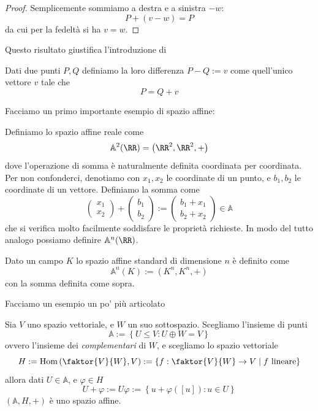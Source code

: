 \documentclass[11pt]{scrartcl}
\begin{document}
   	 \begin{proof}
   	 	Semplicemente sommiamo a destra e a sinistra $-w$:
   	 	$$P+(v-w)=P$$
   	 	da cui per la fedeltà si ha $v=w$.
   	 \end{proof}
   	 Questo risultato giustifica l'introduzione di
   	 \begin{definition}
   	 	Dati due punti $P,Q$ definiamo la loro differenza $P-Q:=v$ come quell'unico vettore $v$ tale che
   	 	$$P=Q+v$$
   	 \end{definition}
   	 Facciamo un primo importante esempio di spazio affine:
   	 \begin{example}
   	 	Definiamo lo spazio affine reale come
   	 	$$\mathbb{A}^2(\RR)=\left(\RR^2,\RR^2,+\right)$$
   	 	dove l'operazione di somma è naturalmente definita coordinata per coordinata. Per non confonderci, denotiamo con $x_1,x_2$ le coordinate di un punto, e $b_1,b_2$ le coordinate di un vettore. Definiamo la somma come
   	 	$$\begin{pmatrix}
   	 		x_1 \\
   	 		x_2
   	 	\end{pmatrix}
   	 	+
   	 	\begin{pmatrix}
   	 		b_1 \\
   	 		b_2
   	 	\end{pmatrix}:=
   	 	\begin{pmatrix}
   	 		b_1+x_1 \\
   	 		b_2+x_2
   	 	\end{pmatrix}\in \mathbb{A}
   	 	$$
   	 	che si verifica molto facilmente soddisfare le proprietà richieste. In modo del tutto analogo possiamo definire $\mathbb{A}^n\!\left(\RR\right)$.
   	 \end{example}
   	 \begin{definition}
   	 	Dato un campo $K$ lo spazio affine standard di dimensione $n$ è definito come
   	 	$$\mathbb{A}^n\left(K\right):=\left(K^n,K^n,+\right)$$
   	 	con la somma definita come sopra.
   	 \end{definition}
   	 Facciamo un esempio un po' più articolato
   	 \begin{example}
   	 	Sia $V$ uno spazio vettoriale, e $W$ un suo sottospazio. Scegliamo l'insieme di punti
   	 	$$\mathbb{A}:=\left\{U\le V:U\oplus W=V\right\}$$
   	 	ovvero l'insieme dei \textit{complementari} di $W$, e scegliamo lo spazio vettoriale 
   	 	$$H:=\text{Hom}\left(\faktor{V}{W},V\right):=\left\{f:\faktor{V}{W}\to V\mid f \text{ lineare}\right\}$$
   	 	allora dati $U\in \mathbb{A}$, e $\varphi\in H$
   	 	$$U+\varphi:=U\varphi:=\left\{u+\varphi(\left[u\right]):u\in U\right\}$$
   	 	$\left(\mathbb{A},H,+\right)$ è uno spazio affine.
   	 \end{example}
   	 
\end{document}
